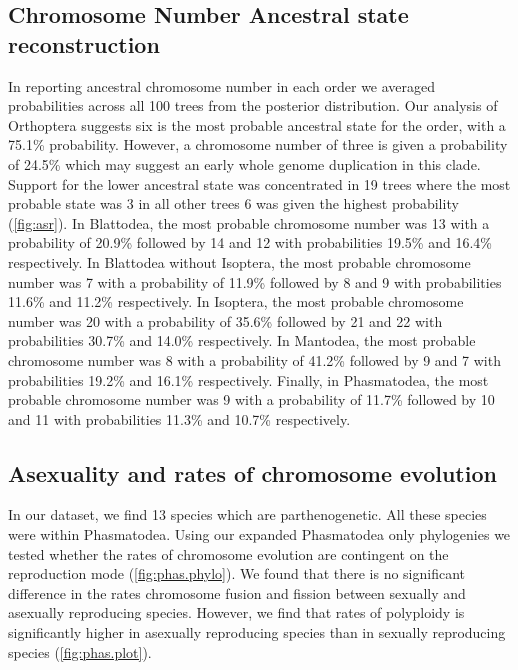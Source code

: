 \subsection{Chromosome Number Ancestral state reconstruction}
In reporting ancestral chromosome number in each order we averaged probabilities across all 100 trees from the posterior distribution. 
Our analysis of Orthoptera suggests six is the most probable ancestral state for the order, with a 75.1\% probability.
However, a chromosome number of three is given a probability of 24.5\% which may suggest an early whole genome duplication in this clade.
Support for the lower ancestral state was concentrated in 19 trees where the most probable state was 3 in all other trees 6 was given the highest probability (\cref{fig:asr}). 
In Blattodea, the most probable chromosome number was 13 with a probability of 20.9\% followed by 14 and 12 with probabilities 19.5\% and 16.4\% respectively. 
In Blattodea without Isoptera, the most probable chromosome number was 7 with a probability of 11.9\% followed by 8 and 9 with probabilities 11.6\% and 11.2\% respectively.
In Isoptera, the most probable chromosome number was 20 with a probability of 35.6\% followed by 21 and 22 with probabilities 30.7\% and 14.0\% respectively.
In Mantodea, the most probable chromosome number was 8 with a probability of 41.2\% followed by 9 and 7 with probabilities 19.2\% and 16.1\% respectively.
Finally, in Phasmatodea, the most probable chromosome number was 9 with a probability of 11.7\% followed by 10 and 11 with probabilities 11.3\% and 10.7\% respectively.

\subsection{Asexuality and rates of chromosome evolution}
In our dataset, we find 13 species which are parthenogenetic.
All these species were within Phasmatodea.
Using our expanded Phasmatodea only phylogenies we tested whether the rates of chromosome evolution are contingent on the reproduction mode (\cref{fig:phas.phylo}).
We found that there is no significant difference in the rates chromosome fusion and fission between sexually and asexually reproducing species.
However, we find that rates of polyploidy is significantly higher in asexually reproducing species than in sexually reproducing species (\cref{fig:phas.plot}).
